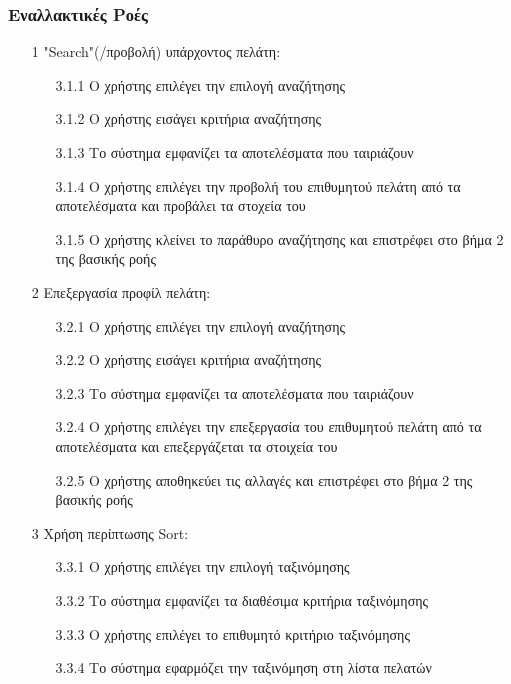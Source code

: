 \documentclass[12pt,a4paper,twoside]{book}
\begin{document}
\subsubsection{Εναλλακτικές Ροές}
\begin{enumerate}
  \item[1 ] "Search"(/προβολή) υπάρχοντος πελάτη: %
        \begin{enumerate}
          \item[3.1.1 ] Ο χρήστης επιλέγει την επιλογή αναζήτησης
          \item[3.1.2 ] Ο χρήστης εισάγει κριτήρια αναζήτησης %
          \item[3.1.3 ] Το σύστημα εμφανίζει τα αποτελέσματα που ταιριάζουν
          \item[3.1.4 ] Ο χρήστης επιλέγει την προβολή του επιθυμητού πελάτη από τα αποτελέσματα και προβάλει τα στοχεία του
          \item[3.1.5 ] Ο χρήστης κλείνει το παράθυρο αναζήτησης και επιστρέφει στο βήμα 2 της βασικής ροής
        \end{enumerate}
  \item[2 ] Επεξεργασία προφίλ πελάτη:
        \begin{enumerate}
          \item[3.2.1 ] Ο χρήστης επιλέγει την επιλογή αναζήτησης
          \item[3.2.2 ] Ο χρήστης εισάγει κριτήρια αναζήτησης %
          \item[3.2.3 ] Το σύστημα εμφανίζει τα αποτελέσματα που ταιριάζουν
          \item[3.2.4 ] Ο χρήστης επιλέγει την επεξεργασία του επιθυμητού πελάτη από τα αποτελέσματα και επεξεργάζεται τα στοιχεία του
          \item[3.2.5 ] Ο χρήστης αποθηκεύει τις αλλαγές και επιστρέφει στο βήμα 2 της βασικής ροής
        \end{enumerate}
  \item[3 ] Χρήση περίπτωσης Sort:
        \begin{enumerate}
          \item[3.3.1 ] Ο χρήστης επιλέγει την επιλογή ταξινόμησης
          \item[3.3.2 ] Το σύστημα εμφανίζει τα διαθέσιμα κριτήρια ταξινόμησης %
          \item[3.3.3 ] Ο χρήστης επιλέγει το επιθυμητό κριτήριο ταξινόμησης
          \item[3.3.4 ] Το σύστημα εφαρμόζει την ταξινόμηση στη λίστα πελατών

\end{enumerate}
\end{enumerate}
\end{document}
